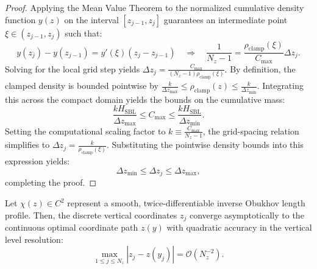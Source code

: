 \begin{proof}
Applying the Mean Value Theorem to the normalized cumulative density function $y(z)$ on the interval $[z_{j-1}, z_j]$ guarantees an intermediate point $\xi \in (z_{j-1}, z_j)$ such that:
\begin{equation}
    y(z_j) - y(z_{j-1}) = y'(\xi) (z_j - z_{j-1}) \quad \Longrightarrow \quad \frac{1}{N_z - 1} = \frac{\rho_{\text{clamp}}(\xi)}{C_{\text{max}}} \Delta z_j. \label{eq:mvt_proof_step}
\end{equation}
Solving for the local grid step yields $\Delta z_j = \frac{C_{\text{max}}}{(N_z - 1) \rho_{\text{clamp}}(\xi)}$. By definition, the clamped density is bounded pointwise by $\frac{k}{\Delta z_{\text{max}}} \le \rho_{\text{clamp}}(z) \le \frac{k}{\Delta z_{\text{min}}}$. Integrating this across the compact domain yields the bounds on the cumulative mass:
\begin{equation}
    \frac{k H_{\text{SBL}}}{\Delta z_{\text{max}}} \le C_{\text{max}} \le \frac{k H_{\text{SBL}}}{\Delta z_{\text{min}}}. \label{eq:cmax_bounds}
\end{equation}
Setting the computational scaling factor to $k \equiv \frac{C_{\text{max}}}{N_z - 1}$, the grid-spacing relation simplifies to $\Delta z_j = \frac{k}{\rho_{\text{clamp}}(\xi)}$. Substituting the pointwise density bounds into this expression yields:
\begin{equation}
    \Delta z_{\text{min}} \le \Delta z_j \le \Delta z_{\text{max}}, \label{eq:bounds_resolved}
\end{equation}
completing the proof.
\end{proof}

\begin{theorem}
\label{thm:grid_convergence}
Let $\chi(z) \in C^2$ represent a smooth, twice-differentiable inverse Obukhov length profile. Then, the discrete vertical coordinates $z_j$ converge asymptotically to the continuous optimal coordinate path $z(y)$ with quadratic accuracy in the vertical level resolution:
\begin{equation}
    \max_{1 \le j \le N_z} \left| z_j - z(y_j) \right| = \mathcal{O}\left( N_z^{-2} \right). \label{eq:convergence_theorem}
\end{equation}
\end{theorem}

